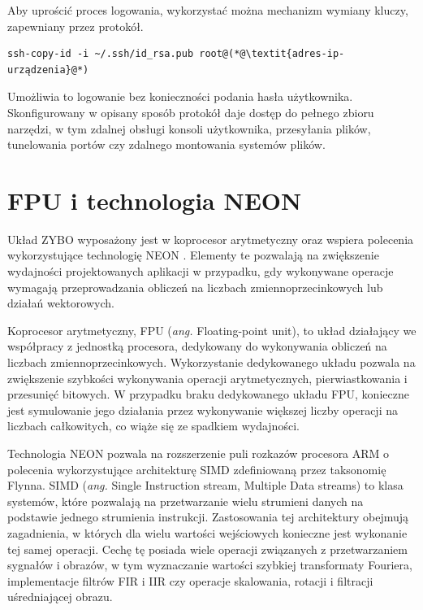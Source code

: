 Aby uprościć proces logowania, wykorzystać można mechanizm wymiany kluczy, zapewniany przez protokół.

\begin{lstlisting}[breaklines=true]
ssh-copy-id -i ~/.ssh/id_rsa.pub root@(*@\textit{adres-ip-urządzenia}@*)
\end{lstlisting}

Umożliwia to logowanie bez konieczności podania hasła użytkownika. 
Skonfigurowany w opisany sposób protokół daje dostęp do pełnego zbioru narzędzi, w tym zdalnej obsługi konsoli użytkownika, przesyłania plików, tunelowania portów czy zdalnego montowania systemów plików.

\section{FPU i technologia NEON}

\label{sec:arm-neon}

Układ ZYBO wyposażony jest w koprocesor arytmetyczny oraz wspiera polecenia wykorzystujące technologię NEON \cite{neon-home}. %
Elementy te pozwalają na zwiększenie wydajności projektowanych aplikacji w przypadku, gdy wykonywane operacje wymagają przeprowadzania obliczeń na liczbach zmiennoprzecinkowych lub działań wektorowych. 

Koprocesor arytmetyczny, FPU (\emph{ang.} Floating-point unit), to układ działający we współpracy z jednostką procesora, dedykowany do wykonywania obliczeń na liczbach zmiennoprzecinkowych. 
Wykorzystanie dedykowanego układu pozwala na zwiększenie szybkości wykonywania operacji arytmetycznych, pierwiastkowania i przesunięć bitowych. 
W przypadku braku dedykowanego układu FPU, konieczne jest symulowanie jego działania przez wykonywanie większej liczby operacji na liczbach całkowitych, co wiąże się ze spadkiem wydajności. %

Technologia NEON pozwala na rozszerzenie puli rozkazów procesora ARM o polecenia wykorzystujące architekturę SIMD zdefiniowaną przez taksonomię Flynna\cite{Flynn1972}.
SIMD (\emph{ang.} Single Instruction stream, Multiple Data streams) to klasa systemów, które pozwalają na przetwarzanie wielu strumieni danych na podstawie jednego strumienia instrukcji. 
Zastosowania tej architektury obejmują zagadnienia, w których dla wielu wartości wejściowych konieczne jest wykonanie tej samej operacji. 
Cechę tę posiada wiele operacji związanych z przetwarzaniem sygnałów i obrazów, w tym  wyznaczanie wartości szybkiej transformaty Fouriera, implementacje filtrów FIR i IIR czy operacje skalowania, rotacji i filtracji uśredniającej obrazu.

